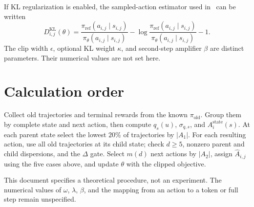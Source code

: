 \documentclass[10pt]{article}
\begin{document}
If KL regularization is enabled, the sampled-action estimator used
in~\cite{shao2024deepseekmath} can be written
\begin{equation}
D^{\mathrm{KL}}_{i,j}(\theta)
=\frac{\pi_{\mathrm{ref}}(a_{i,j}\mid s_{i,j})}
       {\pi_\theta(a_{i,j}\mid s_{i,j})}
 -\log\frac{\pi_{\mathrm{ref}}(a_{i,j}\mid s_{i,j})}
            {\pi_\theta(a_{i,j}\mid s_{i,j})}-1.
\end{equation}
The clip width \(\epsilon\), optional KL weight \(\kappa\), and
second-step amplifier \(\beta\) are distinct parameters. Their
numerical values are not set here.

\section{Calculation order}

Collect old trajectories and terminal rewards from the known
\(\pi_{\mathrm{old}}\). Group them by complete state and next action,
then compute \(q_s(u)\), \(\sigma_{q,s}\), and
\(A_i^{\mathrm{state}}(s)\). At each parent state select the lowest
\(20\%\) of trajectories by \(|A_1|\). For each resulting action,
use all old trajectories at its child state; check \(d\geq5\),
nonzero parent and child dispersions, and the \(\Delta\) gate.
Select \(m(d)\) next actions by \(|A_2|\), assign
\(\widehat A_{i,j}\) using the five cases above, and update
\(\theta\) with the clipped objective.

This document specifies a theoretical procedure, not an experiment.
The numerical values of \(\omega\), \(\lambda\), \(\beta\), and the
mapping from an action to a token or full step remain unspecified.



\end{document}
